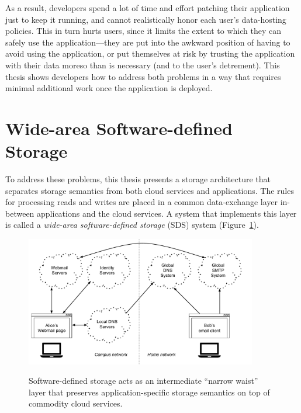 As a result, developers spend a lot of time and effort patching their
application just to keep it running, and cannot realistically honor
each user's data-hosting policies.  This in turn hurts users, since it
limits the extent to which they can safely use the application---they are put
into the awkward position of having to avoid using the application, or put
themselves at risk by trusting the application with their data moreso than is
necessary (and to the user's detrement).  This thesis shows developers how to
address both problems in a way that requires minimal additional work once the
application is deployed.

\section{Wide-area Software-defined Storage}


To address these problems, this thesis presents a 
storage architecture that separates storage semantics
from both cloud services and applications.  The rules for processing reads and writes
are placed in a common data-exchange
layer in-between applications and the cloud services.  A system that
implements this layer is called a \emph{wide-area software-defined storage} (SDS) system
(Figure~\ref{fig:chap1-sds-overview}).

\begin{figure}[h]
   \caption{Software-defined storage acts as an intermediate ``narrow waist''
   layer that preserves application-specific storage semantics on top of
   commodity cloud services.}
   \centering
   \includegraphics[width=0.9\textwidth,page=28]{figures/dissertation-figures}
   \label{fig:chap1-sds-overview}
\end{figure}

